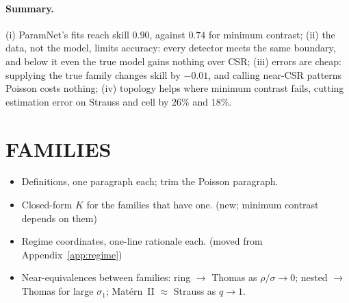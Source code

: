 \documentclass[twoside]{article}
\begin{document}
\paragraph{Summary.}
(i) ParamNet's fits reach skill $0.90$, against $0.74$ for minimum contrast; (ii) the data, not the model, limits accuracy: every detector meets the same boundary, and below it even the true model gains nothing over CSR; (iii) errors are cheap: supplying the true family changes skill by $-0.01$, and calling near-CSR patterns Poisson costs nothing; (iv) topology helps where minimum contrast fails, cutting estimation error on Strauss and cell by $26\%$ and $18\%$.

\begin{table}[!htb]
\caption{Relative change in estimation error $\mathrm{RMSE}(\log\theta)/\mathrm{s.d.}$ ($\tau{=}0.9$) when persistence
images are added to the same network on the summary curves (``Curves alone'': its error). Negative is better; one
training seed (intervals: Appendix~\ref{app:filtrations}). The images help where minimum contrast cannot fit.}
\label{tab:topology}
\begin{center}
\footnotesize

\end{center}
\end{table}


\clearpage
\appendix
\onecolumn
{}


\section{FAMILIES}
\label{app:families}

\begin{itemize}
  \item Definitions, one paragraph each; trim the Poisson paragraph.
  \item Closed-form $K$ for the families that have one. (new; minimum contrast depends on them)
  \item Regime coordinates, one-line rationale each. (moved from Appendix~\ref{app:regime})
  \item \label{app:families-limits}Near-equivalences between families: ring $\to$ Thomas as $\rho/\sigma\to0$; nested $\to$ Thomas for large $\sigma_1$; Mat\'ern~II $\approx$ Strauss as $q\to1$.
\end{itemize}
\end{document}
